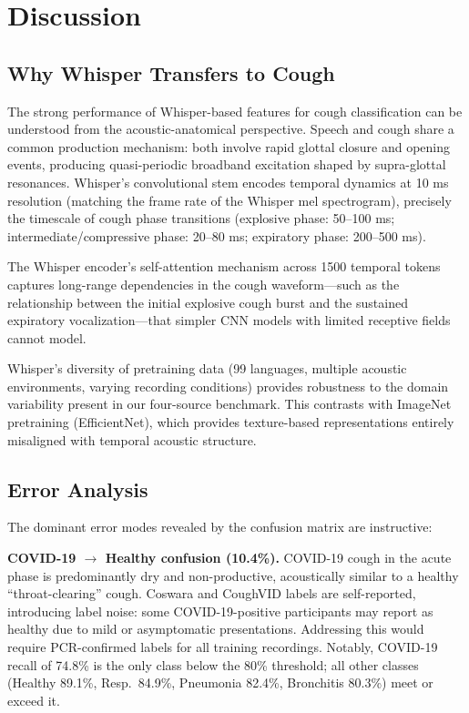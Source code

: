 \documentclass[10pt,journal,compsoc]{IEEEtran}
\begin{document}
\section{Discussion}
\label{sec:discussion}

\subsection{Why Whisper Transfers to Cough}

The strong performance of Whisper-based features for cough classification
can be understood from the acoustic-anatomical perspective.
Speech and cough share a common production mechanism: both involve
rapid glottal closure and opening events, producing quasi-periodic
broadband excitation shaped by supra-glottal resonances.
Whisper's convolutional stem encodes temporal dynamics at 10 ms resolution
(matching the frame rate of the Whisper mel spectrogram), precisely the
timescale of cough phase transitions (explosive phase: 50--100 ms;
intermediate/compressive phase: 20--80 ms; expiratory phase: 200--500 ms).

The Whisper encoder's self-attention mechanism across 1500 temporal tokens
captures long-range dependencies in the cough waveform---such as the
relationship between the initial explosive cough burst and the sustained
expiratory vocalization---that simpler CNN models with limited receptive
fields cannot model.

Whisper's diversity of pretraining data (99 languages, multiple
acoustic environments, varying recording conditions) provides robustness
to the domain variability present in our four-source benchmark. This
contrasts with ImageNet pretraining (EfficientNet), which provides
texture-based representations entirely misaligned with temporal acoustic
structure.

\subsection{Error Analysis}

The dominant error modes revealed by the confusion matrix are instructive:

\textbf{COVID-19 $\to$ Healthy confusion (10.4\%).}
COVID-19 cough in the acute phase is predominantly dry and non-productive,
acoustically similar to a healthy ``throat-clearing'' cough.
Coswara and CoughVID labels are self-reported, introducing
label noise: some COVID-19-positive participants may report as healthy
due to mild or asymptomatic presentations. Addressing this would require
PCR-confirmed labels for all training recordings.
Notably, COVID-19 recall of 74.8\% is the only class below the 80\% threshold;
all other classes (Healthy 89.1\%, Resp.\ 84.9\%, Pneumonia 82.4\%,
Bronchitis 80.3\%) meet or exceed it.
\end{document}
